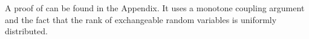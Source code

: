 \documentclass[a4paper,11pt]{article}
\newcommand{\zg}[1]{{\color{blue} [ZG: #1]}}
\theoremstyle{plain}
\newtheorem{corollary}{Corollary}[section]
\theoremstyle{definition}
\def\calH{\mathcal{H}}
\theoremstyle{plain}
\newcommand{\NoNc}{m}
\newcommand{\testStatistics}[1]{{T_{#1}}}
\newcommand{\cdfTestStatistics}[1]{{F_{#1}}}
\newcommand{\ncTestStatistics}[1]{{C_{#1}}}
\newcommand{\ncCdfTestStatistics}[1]{{F^{\text{nc}}_{#1}}}
\newcommand{\nickname}{{\text{RANC}}}
\newcommand{\nullHypothesisSet}{{\calH_{0}}}
\newcommand{\ncHypothesis}[1]{{H^{\text{nc}}_{#1}}}
\newcommand{\ncHypothesisSet}{{\calH_{\text{nc}}}}
\begin{document}



A proof of  can be found in the
Appendix. It uses a monotone coupling argument and the fact that the
rank of exchangeable random variables is uniformly distributed.
\end{document}
